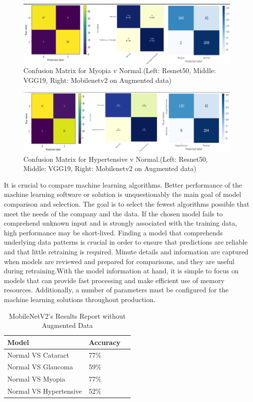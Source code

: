 \begin{figure}[H]
    \centering
    \includegraphics[scale=0.7]{50_Chapter_5/MNC.png}
    \caption{Confusion Matrix for Myopia v Normal.(Left: Resnet50, Middle: VGG19, Right: Mobilenetv2 on Augmented data)}
    \label{MNC}
\end{figure}
\begin{figure}[H]
    \centering
    \includegraphics[scale=0.55]{50_Chapter_5/HNC.png}
    \caption{Confusion Matrix for Hypertensive v Normal.(Left: Resnet50, Middle: VGG19, Right: Mobilenetv2 on Augmented data)}
    \label{HNC}
\end{figure}
It is crucial to compare machine learning algorithms. Better performance of the machine learning software or solution is unquestionably the main goal of model comparison and selection. The goal is to select the fewest algorithms possible that meet the needs of the company and the data. If the chosen model fails to comprehend unknown input and is strongly associated with the training data, high performance may be short-lived. Finding a model that comprehends underlying data patterns is crucial in order to ensure that predictions are reliable and that little retraining is required. Minute details and information are captured when models are reviewed and prepared for comparisons, and they are useful during retraining.With the model information at hand, it is simple to focus on models that can provide fast processing and make efficient use of memory resources. Additionally, a number of parameters must be configured for the machine learning solutions throughout production.\\
\begin{table}[H]
\caption{MobileNetV2's Results Report without Augmented Data}
    \centering
    \begin{tabular}{|l|l|l|}
    \hline
        Model &  Accuracy \\ \hline
        Normal VS Cataract &  77\% \\ \hline
        Normal VS Glaucoma &  59\% \\ \hline
        Normal VS Myopia & 77\% \\ \hline
        Normal VS Hypertensive &  52\% \\ \hline
    \end{tabular}
\end{table}

